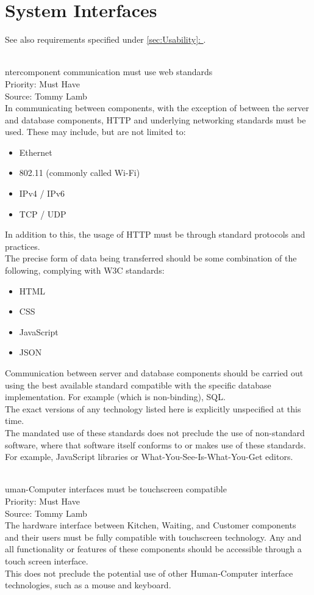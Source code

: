 \documentclass[11pt, a4paper]{report}
\newcommand{\gref}[1]{\hyperref[#1]{\autoref*{#1}: \nameref{#1}}} %
\def\itempar#1\\{\item \textbf{#1}\\} %
\begin{document}
\section{System Interfaces} \label{sec:Interfaces}

See also requirements specified under \gref{sec:Usability}.

\begin{enumerate}[resume*=nonfunctional]

\itempar Intercomponent communication must use web standards\\
Priority: Must Have\\
Source: Tommy Lamb\\
In communicating between components, with the exception of between the server and database components, HTTP and underlying networking standards must be used. These may include, but are not limited to:
\begin{itemize}
\item Ethernet
\item 802.11 (commonly called Wi-Fi)
\item IPv4 / IPv6
\item TCP / UDP
\end{itemize} 
In addition to this, the usage of HTTP must be through standard protocols and practices.\\
The precise form of data being transferred should be some combination of the following, complying with W3C standards:
\begin{itemize}
\item HTML
\item CSS
\item JavaScript
\item JSON
\end{itemize}
Communication between server and database components should be carried out using the best available standard compatible with the specific database implementation. For example (which is non-binding), SQL.\\
The exact versions of any technology listed here is explicitly unspecified at this time.\\
The mandated use of these standards does not preclude the use of non-standard software, where that software itself conforms to or makes use of these standards. For example, JavaScript libraries or What-You-See-Is-What-You-Get editors.

\itempar Human-Computer interfaces must be touchscreen compatible\\
Priority: Must Have\\
Source: Tommy Lamb\\
The hardware interface between Kitchen, Waiting, and Customer components and their users must be fully compatible with touchscreen technology. Any and all functionality or features of these components should be accessible through a touch screen interface.\\
This does not preclude the potential use of other Human-Computer interface technologies, such as a mouse and keyboard.


\end{enumerate}
\end{document}
